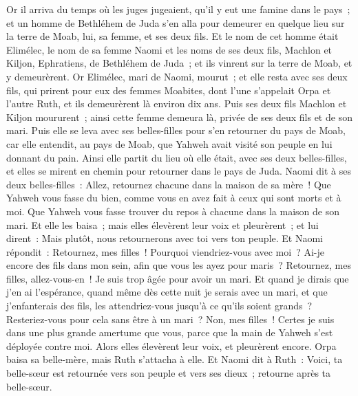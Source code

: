 \begin{multicols}{2}
\VerseOne{}Or il arriva du temps où les juges jugeaient, qu'il y eut une famine dans le pays~; et un homme de Bethléhem de Juda s'en alla pour demeurer en quelque lieu sur la terre de Moab, lui, sa femme, et ses deux fils.
Et le nom de cet homme était Elimélec, le nom de sa femme Naomi et les noms de ses deux fils, Machlon et Kiljon, Ephratiens, de Bethléhem de Juda~; et ils vinrent sur la terre de Moab, et y demeurèrent.
Or Elimélec, mari de Naomi, mourut~; et elle resta avec ses deux fils,
qui prirent pour eux des femmes Moabites, dont l'une s'appelait Orpa et l'autre Ruth, et ils demeurèrent là environ dix ans.
Puis ses deux fils Machlon et Kiljon moururent~; ainsi cette femme demeura là, privée de ses deux fils et de son mari.
Puis elle se leva avec ses belles-filles pour s'en retourner du pays de Moab, car elle entendit, au pays de Moab, que Yahweh avait visité son peuple en lui donnant du pain.
Ainsi elle partit du lieu où elle était, avec ses deux belles-filles, et elles se mirent en chemin pour retourner dans le pays de Juda.
Naomi dit à ses deux belles-filles~: Allez, retournez chacune dans la maison de sa mère~! Que Yahweh vous fasse du bien, comme vous en avez fait à ceux qui sont morts et à moi.
Que Yahweh vous fasse trouver du repos à chacune dans la maison de son mari. Et elle les baisa~; mais elles élevèrent leur voix et pleurèrent~;
et lui dirent~: Mais plutôt, nous retournerons avec toi vers ton peuple.
Et Naomi répondit~: Retournez, mes filles~! Pourquoi viendriez-vous avec moi~? Ai-je encore des fils dans mon sein, afin que vous les ayez pour maris~?
Retournez, mes filles, allez-vous-en~! Je suis trop âgée pour avoir un mari. Et quand je dirais que j'en ai l'espérance, quand même dès cette nuit je serais avec un mari, et que j'enfanterais des fils,
les attendriez-vous jusqu'à ce qu'ils soient grands~? Resteriez-vous pour cela sans être à un mari~? Non, mes filles~! Certes je suis dans une plus grande amertume que vous, parce que la main de Yahweh s'est déployée contre moi.
Alors elles élevèrent leur voix, et pleurèrent encore. Orpa baisa sa belle-mère, mais Ruth s'attacha à elle.
Et Naomi dit à Ruth~: Voici, ta belle-sœur est retournée vers son peuple et vers ses dieux~; retourne après ta belle-sœur.

\end{multicols}
